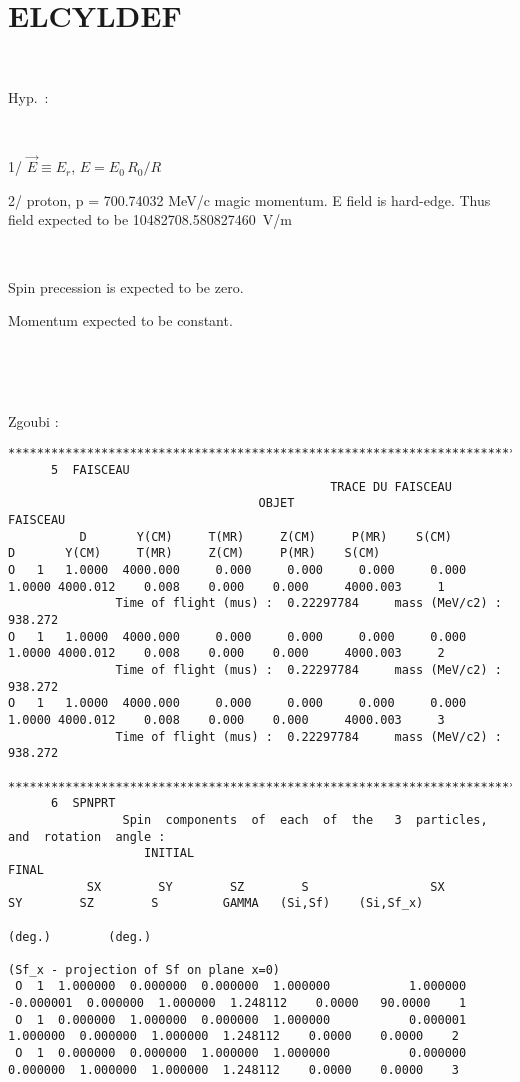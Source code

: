 \documentclass[10pt]{article}
\begin{document}
\clearpage

\section*{ELCYLDEF}

~

Hyp.~: 

~

1/ $\vec E \equiv E_r$,  $E = E_0 \, R_0 / R$ 

2/ proton, p = 700.74032 MeV/c magic momentum.  E field is  hard-edge. Thus field expected to be 10482708.580827460~V/m


~

Spin precession is expected to be zero. 

Momentum expected to be constant. 
         

~

~

  Zgoubi :
{\footnotesize
\begin{verbatim}
***********************************************************************************************
      5  FAISCEAU                          
                                             TRACE DU FAISCEAU
                                   OBJET                                                  FAISCEAU
          D       Y(CM)     T(MR)     Z(CM)     P(MR)    S(CM)          D       Y(CM)     T(MR)     Z(CM)     P(MR)    S(CM)
O   1   1.0000  4000.000     0.000     0.000     0.000     0.000       1.0000 4000.012    0.008    0.000    0.000     4000.003     1
               Time of flight (mus) :  0.22297784     mass (MeV/c2) :   938.272    
O   1   1.0000  4000.000     0.000     0.000     0.000     0.000       1.0000 4000.012    0.008    0.000    0.000     4000.003     2
               Time of flight (mus) :  0.22297784     mass (MeV/c2) :   938.272    
O   1   1.0000  4000.000     0.000     0.000     0.000     0.000       1.0000 4000.012    0.008    0.000    0.000     4000.003     3
               Time of flight (mus) :  0.22297784     mass (MeV/c2) :   938.272    

***********************************************************************************************
      6  SPNPRT                            
                Spin  components  of  each  of  the   3  particles,  and  rotation  angle :
                   INITIAL                                           FINAL
           SX        SY        SZ        S                 SX        SY        SZ        S         GAMMA   (Si,Sf)    (Si,Sf_x)
                                                                                                          (deg.)        (deg.)
                                                                                      (Sf_x - projection of Sf on plane x=0)
 O  1  1.000000  0.000000  0.000000  1.000000           1.000000 -0.000001  0.000000  1.000000  1.248112    0.0000   90.0000    1
 O  1  0.000000  1.000000  0.000000  1.000000           0.000001  1.000000  0.000000  1.000000  1.248112    0.0000    0.0000    2
 O  1  0.000000  0.000000  1.000000  1.000000           0.000000  0.000000  1.000000  1.000000  1.248112    0.0000    0.0000    3
\end{verbatim}
}
\end{document}
